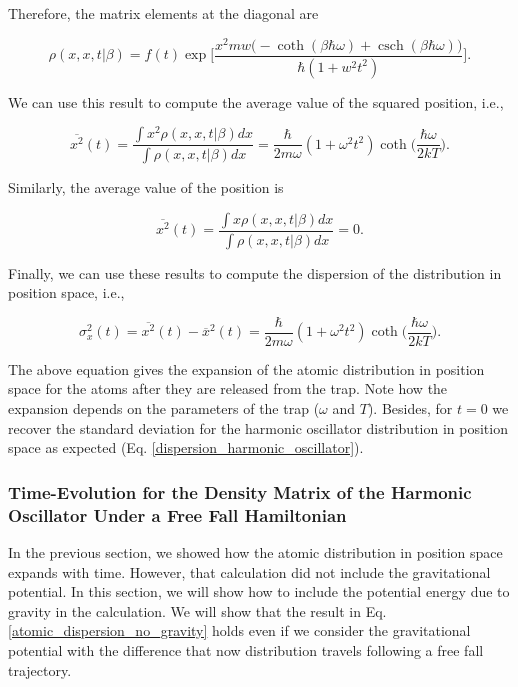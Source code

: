 \documentclass{article}
\DeclareMathOperator{\csch}{csch}
\begin{document}
Therefore, the matrix elements at the diagonal are

\begin{equation}
    \rho(x, x, t|\beta) = f(t) \exp \bigg[\frac{x^{2}mw \big( -\coth(\beta \hbar \omega) + \csch(\beta \hbar \omega) \big)}{\hbar (1+w^{2}t^{2})} \bigg].
\end{equation}

We can use this result to compute the average value of the squared position, i.e.,

\begin{equation}
    \overline{x^{2}} (t)= \frac{\int x^{2} \rho(x,x,t|\beta) dx}{\int \rho(x,x,t|\beta) dx} =  \frac{\hbar}{2m\omega}(1+\omega^{2}t^{2})\coth \bigg( \frac{\hbar \omega}{2 k T} \bigg).
\end{equation}

Similarly, the average value of the position is

\begin{equation}
    \overline{x^{2}} (t)= \frac{\int x \rho(x,x,t|\beta) dx}{\int \rho(x,x,t|\beta) dx} =  0.
\end{equation}

Finally, we can use these results to compute the dispersion of the distribution in position space, i.e.,

\begin{equation}\label{atomic_dispersion_no_gravity}
    \sigma_{x}^{2} (t)= \overline{x^{2}}(t) - \overline{x}^{2}(t) = \frac{\hbar}{2m\omega}(1+\omega^{2}t^{2})\coth\bigg( \frac{\hbar \omega}{2kT} \bigg).
\end{equation}

The above equation gives the expansion of the atomic distribution in position space for the atoms after they are released from the trap. Note how the expansion depends on the parameters of the trap ($\omega$ and $T$). Besides, for $t=0$ we recover the standard deviation for the harmonic oscillator distribution in position space as expected (Eq. \ref{dispersion_harmonic_oscillator}).

\subsubsection{Time-Evolution for the Density Matrix of the Harmonic Oscillator Under a Free Fall Hamiltonian}
In the previous section, we showed how the atomic distribution in position space expands with time. However, that calculation did not include the gravitational potential. In this section, we will show how to include the potential energy due to gravity in the calculation. We will show that the result in Eq. \ref{atomic_dispersion_no_gravity} holds even if we consider the gravitational potential with the difference that now distribution travels following a free fall trajectory.
\end{document}
